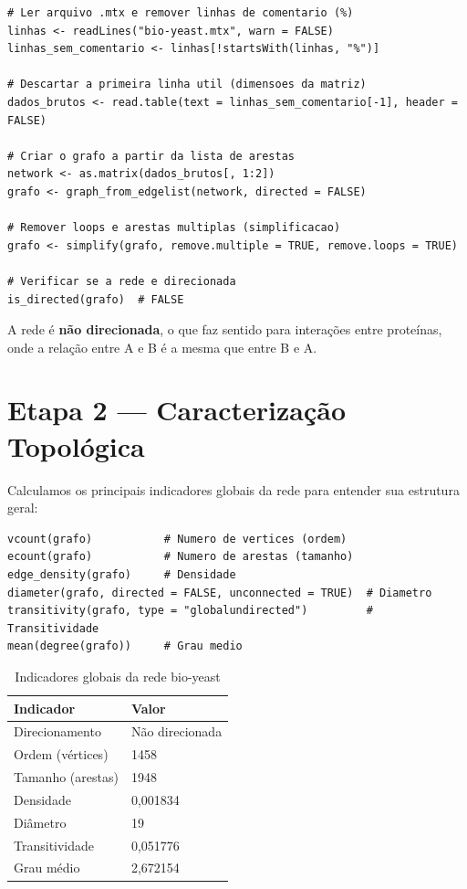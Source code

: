 \documentclass[12pt,a4paper]{article}
\begin{document}
\begin{lstlisting}
# Ler arquivo .mtx e remover linhas de comentario (%)
linhas <- readLines("bio-yeast.mtx", warn = FALSE)
linhas_sem_comentario <- linhas[!startsWith(linhas, "%")]

# Descartar a primeira linha util (dimensoes da matriz)
dados_brutos <- read.table(text = linhas_sem_comentario[-1], header = FALSE)

# Criar o grafo a partir da lista de arestas
network <- as.matrix(dados_brutos[, 1:2])
grafo <- graph_from_edgelist(network, directed = FALSE)

# Remover loops e arestas multiplas (simplificacao)
grafo <- simplify(grafo, remove.multiple = TRUE, remove.loops = TRUE)

# Verificar se a rede e direcionada
is_directed(grafo)  # FALSE
\end{lstlisting}

A rede é \textbf{não direcionada}, o que faz sentido para interações entre proteínas, onde a relação entre A e B é a mesma que entre B e A.

\section{Etapa 2 — Caracterização Topológica}

Calculamos os principais indicadores globais da rede para entender sua estrutura geral:

\begin{lstlisting}
vcount(grafo)           # Numero de vertices (ordem)
ecount(grafo)           # Numero de arestas (tamanho)
edge_density(grafo)     # Densidade
diameter(grafo, directed = FALSE, unconnected = TRUE)  # Diametro
transitivity(grafo, type = "globalundirected")         # Transitividade
mean(degree(grafo))     # Grau medio
\end{lstlisting}

\begin{table}[H]
\centering
\caption{Indicadores globais da rede bio-yeast}
\begin{tabular}{ll}
\toprule
\textbf{Indicador} & \textbf{Valor} \\
\midrule
Direcionamento     & Não direcionada \\
Ordem (vértices)   & 1458 \\
Tamanho (arestas)  & 1948 \\
Densidade          & 0,001834 \\
Diâmetro           & 19 \\
Transitividade     & 0,051776 \\
Grau médio         & 2,672154 \\
\bottomrule
\end{tabular}
\end{table}
\end{document}
